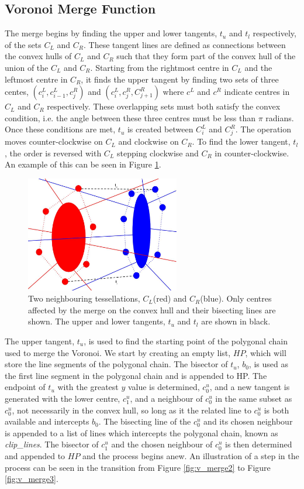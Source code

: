 \subsection{Voronoi Merge Function}
The merge begins by finding the upper and lower tangents, $t_u$ and $t_l$ respectively, of the sets $C_L$ and $C_R$. These tangent lines are defined as connections between the convex hulls of $C_L$ and $C_R$ such that they form part of the convex hull of the union of the $C_L$ and $C_R$. Starting from the rightmost centre in $C_L$ and the leftmost centre in $C_R$, it finds the upper tangent by finding two sets of three centes, $(c^L_i,c^L_{i-1},c^R_j)$ and $(c^L_i,c^R_j,C^R_{j+1})$ where $c^L$ and $c^R$ indicate centres in $C_L$ and $C_R$ respectively. These overlapping sets must both satisfy the convex condition, i.e. the angle between these three centres must be less than $\pi$ radians. Once these conditions are met, $t_u$ is created between $C^L_i$ and $C^R_j$. The operation moves counter-clockwise on $C_L$ and clockwise on $C_R$. To find the lower tangent, $t_l$, the order is reversed with $C_L$ stepping clockwise and $C_R$ in counter-clockwise. An example of this can be seen in Figure \ref{fig:v_merge1}.
\begin{figure}[H]
\centering
\includegraphics[width=0.6\textwidth]{Images/v_merge1.jpg}
\caption{Two neighbouring tessellations, $C_L$(red) and $C_R$(blue). Only centres affected by the merge on the convex hull and their bisecting lines are shown. The upper and lower tangents, $t_u$ and $t_l$ are shown in black.}
\label{fig:v_merge1}
\end{figure}
The upper tangent, $t_u$, is used to find the starting point of the polygonal chain used to merge the Voronoi. We start by creating an empty list, $HP$, which will store the line segments of the polygonal chain. The bisector of $t_u$, $b_0$, is used as the first line segment in the polygonal chain and is appended to HP. The endpoint of $t_u$ with the greatest $y$ value is determined, $c^u_0$, and a new tangent is generated with the lower centre, $c^u_1$, and a neighbour of $c^u_0$ in the same subset as $c^u_0$, not necessarily in the convex hull, so long as it the related line to $c^u_0$ is both available and intercepts $b_0$. The bisecting line of the $c^u_0$ and its chosen neighbour is appended to a list of lines which intercepts the polygonal chain, known as \textit{clip\_lines}. The bisector of $c^u_1$ and the chosen neighbour of $c^u_0$ is then determined and appended to $HP$ and the process begins anew. An illustration of a step in the process can be seen in the transition from Figure \ref{fig:v_merge2} to Figure \ref{fig:v_merge3}.
